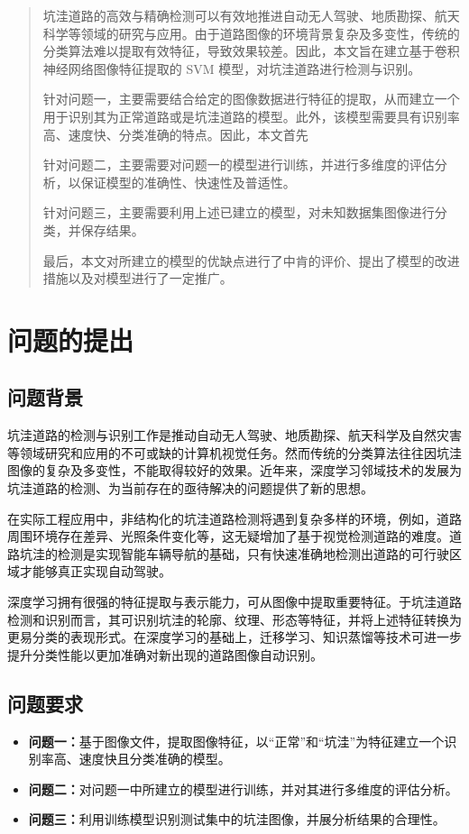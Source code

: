 \documentclass{MathorCupmodeling}
\begin{document}
	\begin{abstract}
		坑洼道路的高效与精确检测可以有效地推进自动无人驾驶、地质勘探、航天科学等领域的研究与应用。由于道路图像的环境背景复杂及多变性，传统的分类算法难以提取有效特征，导致效果较差。因此，本文旨在建立基于卷积神经网络图像特征提取的 SVM 模型，对坑洼道路进行检测与识别。
		
		{\heiti 针对问题一}，主要需要结合给定的图像数据进行特征的提取，从而建立一个用于识别其为正常道路或是坑洼道路的模型。此外，该模型需要具有识别率高、速度快、分类准确的特点。因此，本文首先

		{\heiti 针对问题二}，主要需要对问题一的模型进行训练，并进行多维度的评估分析，以保证模型的准确性、快速性及普适性。

		{\heiti 针对问题三}，主要需要利用上述已建立的模型，对未知数据集图像进行分类，并保存结果。
		
		{\heiti 最后}，本文对所建立的模型的优缺点进行了中肯的评价、提出了模型的改进措施以及对模型进行了一定推广。
	\end{abstract}

	\pagestyle{empty}
	\tableofcontents
	\newpage
	\pagestyle{fancy}

	\setcounter{page}{1}
	\section{问题的提出}
	\subsection{问题背景}
	坑洼道路的检测与识别工作是推动自动无人驾驶、地质勘探、航天科学及自然灾害等领域研究和应用的不可或缺的计算机视觉任务。然而传统的分类算法往往因坑洼图像的复杂及多变性，不能取得较好的效果。近年来，深度学习邻域技术的发展为坑洼道路的检测、为当前存在的亟待解决的问题提供了新的思想。

	在实际工程应用中，非结构化的坑洼道路检测将遇到复杂多样的环境，例如，道路周围环境存在差异、光照条件变化等，这无疑增加了基于视觉检测道路的难度\textcolor{blue}{\cite{曹江华}}。道路坑洼的检测是实现智能车辆导航的基础，只有快速准确地检测出道路的可行驶区域才能够真正实现自动驾驶。

	深度学习拥有很强的特征提取与表示能力，可从图像中提取重要特征。于坑洼道路检测和识别而言，其可识别坑洼的轮廓、纹理、形态等特征，并将上述特征转换为更易分类的表现形式。在深度学习的基础上，迁移学习、知识蒸馏等技术可进一步提升分类性能以更加准确对新出现的道路图像自动识别。
	\subsection{问题要求}
	\begin{itemize}
		\item \textbf{问题一：}基于图像文件，提取图像特征，以“正常”和“坑洼”为特征建立一个识别率高、速度快且分类准确的模型。
		\item \textbf{问题二：}对问题一中所建立的模型进行训练，并对其进行多维度的评估分析。
		\item \textbf{问题三：}利用训练模型识别测试集中的坑洼图像，并展分析结果的合理性。
	\end{itemize}
\end{document}
